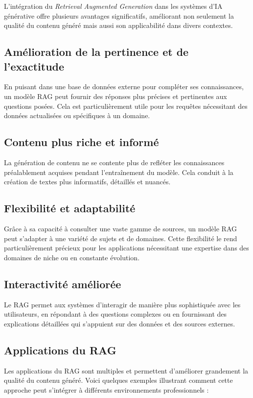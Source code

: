 L’intégration du \textit{Retrieval Augmented Generation} dans les systèmes d’IA
générative offre plusieurs avantages significatifs, améliorant non seulement la qualité
du contenu généré mais aussi son applicabilité dans divers contextes.

\subsection*{Amélioration de la pertinence et de l'exactitude}
En puisant dans une base de données externe pour compléter ses connaissances, un
modèle RAG peut fournir des réponses plus précises et pertinentes aux questions
posées. Cela est particulièrement utile pour les requêtes nécessitant des données
actualisées ou spécifiques à un domaine.

\subsection*{Contenu plus riche et informé}
La génération de contenu ne se contente plus de refléter les connaissances préalablement
acquises pendant l’entraînement du modèle. Cela conduit à la création de textes
plus informatifs, détaillés et nuancés.

\subsection*{Flexibilité et adaptabilité}
Grâce à sa capacité à consulter une vaste gamme de sources, un modèle RAG peut
s’adapter à une variété de sujets et de domaines. Cette flexibilité le rend particulièrement
précieux pour les applications nécessitant une expertise dans des domaines de niche
ou en constante évolution.

\subsection*{Interactivité améliorée}
Le RAG permet aux systèmes d’interagir de manière plus sophistiquée avec les utilisateurs,
en répondant à des questions complexes ou en fournissant des explications
détaillées qui s’appuient sur des données et des sources externes.

\subsection*{Applications du RAG}

Les applications du RAG sont multiples et permettent d’améliorer grandement la qualité
du contenu généré. Voici quelques exemples illustrant comment cette approche
peut s’intégrer à différents environnements professionnels :

